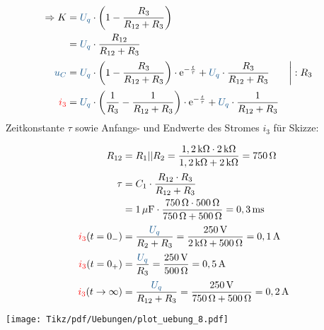 {\begin{align*}
    \Rightarrow K &= \ecv{U_q} \cdot \left( 1 - \frac{R_3}{R_{12}+R_3} \right)\\
    &= \ecv{U_q} \cdot \frac{R_{12}}{R_{12}+R_3}\\[2pt]
    \ecv{u_C} &= \ecv{U_q} \cdot \left( 1 - \frac{R_3}{R_{12}+R_3} \right) \cdot \mathrm{e}^{-\frac{t}{\tau}} + \ecv{U_q} \cdot \frac{R_3}{R_{12}+R_3}& &\bigg| :R_3\\[2pt]
    \eci{i_3} &= \ecv{U_q} \cdot \left( \frac{1}{R_3} - \frac{1}{R_{12}+R_3} \right) \cdot \mathrm{e}^{-\frac{t}{\tau}} + \ecv{U_q} \cdot \frac{1}{R_{12}+R_3}
\end{align*}
Zeitkonstante $\tau$ sowie Anfangs- und Endwerte des Stromes $i_3$ für Skizze:\\
\begin{minipage}{0.5\textwidth}%
\begin{align*}
    R_{12} &= R_1||R_2 = \frac{1,2\,\mathrm{k}\Omega \cdot 2\,\mathrm{k}\Omega}{1,2\,\mathrm{k}\Omega + 2\,\mathrm{k}\Omega} = 750\,\Omega\\[2pt]
    \tau &= C_1 \cdot \frac{R_{12} \cdot R_3}{R_{12} + R_3} \\
    &= 1\,\mu \mathrm{F} \cdot \frac{750\,\Omega \cdot 500\,\Omega}{750\,\Omega + 500\,\Omega} = 0,3\,\mathrm{ms} \\[2pt]
    \eci{i_3}(t=0_{-}) &= \frac{\ecv{U_q}}{R_{2}+R_3} = \frac{250\,\mathrm{V}}{2\,\mathrm{k}\Omega + 500\,\Omega} = 0,1\,\mathrm{A}\\[2pt]
    \eci{i_3}(t=0_{+}) &= \frac{\ecv{U_q}}{R_3} = \frac{250\,\mathrm{V}}{500\,\Omega} = 0,5\,\mathrm{A}\\[2pt]
    \eci{i_3}(t\to\infty) &= \frac{\ecv{U_q}}{R_{12}+R_3} = \frac{250\,\mathrm{V}}{750\,\Omega + 500\,\Omega} = 0,2\,\mathrm{A}
\end{align*}
\end{minipage}%
\begin{minipage}{0.5\textwidth}\centering%
\texttt{[image: Tikz/pdf/Uebungen/plot\_uebung\_8.pdf]}
\end{minipage}
}


